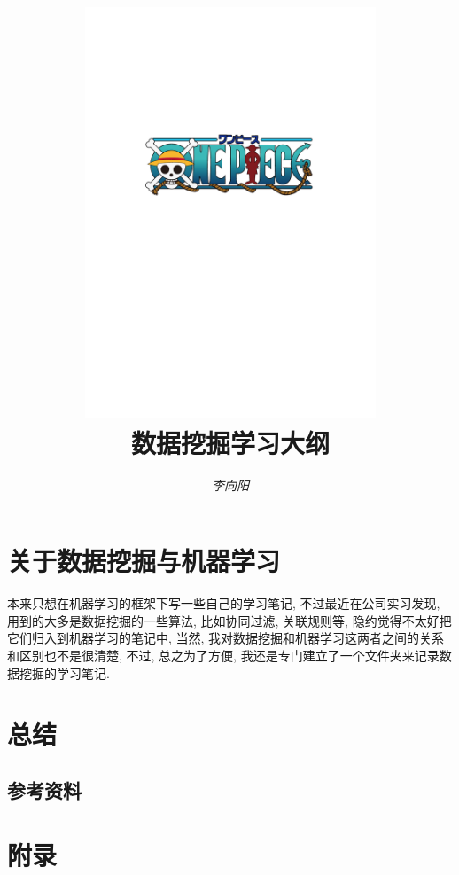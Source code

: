 \documentclass[a4paper,UTF8]{ctexart}
\theoremstyle{plain} \newtheorem{theorem}{定理}[section]
\theoremstyle{plain} \newtheorem{definition}{定义}[section]
\theoremstyle{plain} \newtheorem{lemma}{引理}[section]
\theoremstyle{plain} \newtheorem{proposition}{命题}[section]
\theoremstyle{plain} \newtheorem{example}{例}
\theoremstyle{plain} \newtheorem{remark}{注}
\theoremstyle{plain} \newtheorem{corollary}{推论}[section]
\begin{document}
\title{
\includegraphics[width=0.65\textwidth]{onepiece.pdf}\\
\vspace{2em}
\textbf{数据挖掘学习大纲}}
\author{\emph{李向阳} 
}
\date{}


\maketitle
\thispagestyle{empty}

\newpage


\tableofcontents

\newpage

\section{关于数据挖掘与机器学习}
本来只想在机器学习的框架下写一些自己的学习笔记, 不过最近在公司实习发现, 用到的大多是数据挖掘的一些算法, 比如协同过滤, 关联规则等, 隐约觉得不太好把它们归入到机器学习的笔记中, 当然, 我对数据挖掘和机器学习这两者之间的关系和区别也不是很清楚, 不过, 总之为了方便, 我还是专门建立了一个文件夹来记录数据挖掘的学习笔记.





\section{总结}
\subsection{参考资料}









\newpage

\section*{附录}
\end{document}
